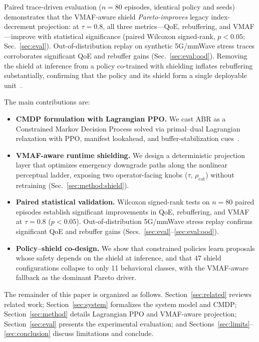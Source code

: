 \documentclass[preprint,12pt,times]{elsarticle}
\providecommand{\VNepisodes}{80}
\providecommand{\VShieldVariants}{47}
\providecommand{\VShieldBehaviors}{11}
\begin{document}
Paired trace-driven evaluation ($n{=}\VNepisodes$ episodes, identical policy and seeds) demonstrates that the VMAF-aware shield \emph{Pareto-improves} legacy index-decrement projection: at $\tau{=}0.8$, all three metrics---QoE, rebuffering, and VMAF---improve with statistical significance (paired Wilcoxon signed-rank, $p{<}0.05$; Sec.~\ref{sec:eval}).
Out-of-distribution replay on synthetic 5G/mmWave stress traces corroborates significant QoE and rebuffer gains (Sec.~\ref{sec:eval:ood}).
Removing the shield at inference from a policy co-trained with shielding inflates rebuffering substantially, confirming that the policy and its shield form a single deployable unit~\cite{alshiekh2018shielding}.

The main contributions are:
\begin{itemize}
  \item \textbf{CMDP formulation with Lagrangian PPO.} We cast ABR as a Constrained Markov Decision Process solved via primal--dual Lagrangian relaxation with PPO, manifest lookahead, and buffer-stabilization cues~\cite{altman1999constrained,paternain2019dual,schulman2017proximal}.

  \item \textbf{VMAF-aware runtime shielding.} We design a deterministic projection layer that optimizes emergency downgrade paths along the nonlinear perceptual ladder, exposing two operator-facing knobs ($\tau$, $\rho_{\mathrm{cat}}$) without retraining (Sec.~\ref{sec:method:shield}).

  \item \textbf{Paired statistical validation.} Wilcoxon signed-rank tests on $n{=}\VNepisodes$ paired episodes establish significant improvements in QoE, rebuffering, and VMAF at $\tau{=}0.8$ ($p{<}0.05$). Out-of-distribution 5G/mmWave stress replay confirms significant QoE and rebuffer gains (Secs.~\ref{sec:eval}--\ref{sec:eval:ood}).

  \item \textbf{Policy--shield co-design.} We show that constrained policies learn proposals whose safety depends on the shield at inference, and that \VShieldVariants{} shield configurations collapse to only \VShieldBehaviors{} behavioral classes, with the VMAF-aware fallback as the dominant Pareto driver.
\end{itemize}

The remainder of this paper is organized as follows.
Section~\ref{sec:related} reviews related work; Section~\ref{sec:system} formalizes the system model and CMDP; Section~\ref{sec:method} details Lagrangian PPO and VMAF-aware projection; Section~\ref{sec:eval} presents the experimental evaluation; and Sections~\ref{sec:limits}--\ref{sec:conclusion} discuss limitations and conclude.
\end{document}
